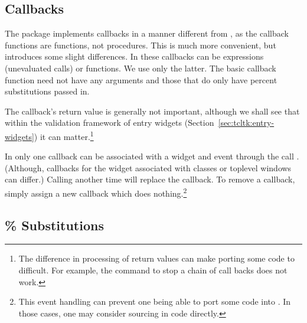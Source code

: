 \subsection{Callbacks}
\label{sec:tcltk:callbacks}

The  package implements callbacks in a manner different
from \TK, as the callback functions are \R\/ functions, not \TK\/
procedures. This is much more convenient, but introduces some slight
differences.  In  these callbacks can be expressions
(unevaluated calls) or functions. We use only the latter. The basic
callback function need not have any arguments and those that do only
have percent substitutions passed in.


The callback's return value is generally not important, although we
shall see that within the validation framework of entry widgets
(Section~\ref{sec:tcltk:entry-widgets}) it can matter.\footnote{The
  difference in processing of return values can make porting some
  \Tk\/ code to  difficult. For example, the 
  command to stop a chain of call backs does not work.}



In  only one callback can be associated with a widget and
event through the call
. (Although, callbacks for the
widget associated with classes or toplevel windows can differ.)
Calling  another time will replace the callback. To
remove a callback, simply assign a new callback which does
nothing.\footnote{This event handling can prevent one being able to port
  some \Tk\/ code into . In those cases, one may consider
  sourcing in \Tcl\/ code directly.}



\subsection{\% Substitutions}
\label{sec:tcltk-percent-substitutions}


